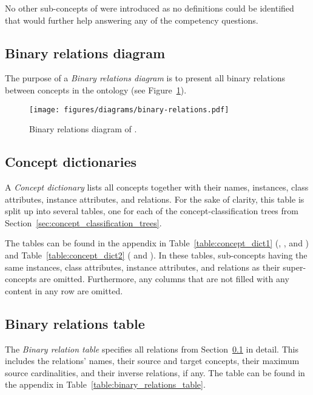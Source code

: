 No other sub-concepts of  were introduced as no definitions could be identified that would further help answering any of the competency questions.

\subsection{Binary relations diagram}
\label{subsec:binary_relations_diagram}

The purpose of a \emph{Binary relations diagram} is to present all binary relations between concepts in the ontology (see Figure~\ref{fig:binary_relations}).

\begin{figure}
  \centering
  \texttt{[image: figures/diagrams/binary-relations.pdf]}
  \caption[Binary relations diagram]{Binary relations diagram of \smarthomeweather.}
  \label{fig:binary_relations}
\end{figure}

\subsection{Concept dictionaries}
\label{subsec:concept_dictionaries}

A \emph{Concept dictionary} lists all concepts together with their names, instances, class attributes, instance attributes, and relations. For the sake of clarity, this table is split up into several tables, one for each of the concept-classification trees from Section~\ref{sec:concept_classification_trees}.

The tables can be found in the appendix in Table~\ref{table:concept_dict1} (, , and ) and Table~\ref{table:concept_dict2} ( and ). In these tables, sub-concepts having the same instances, class attributes, instance attributes, and relations as their super-concepts are omitted. Furthermore, any columns that are not filled with any content in any row are omitted.

\subsection{Binary relations table}
\label{subsec:binary_relations_table}

The \emph{Binary relation table} specifies all relations from Section~\ref{subsec:binary_relations_diagram} in detail. This includes the relations' names, their source and target concepts, their maximum source cardinalities, and their inverse relations, if any. The table can be found in the appendix in Table~\ref{table:binary_relations_table}.

